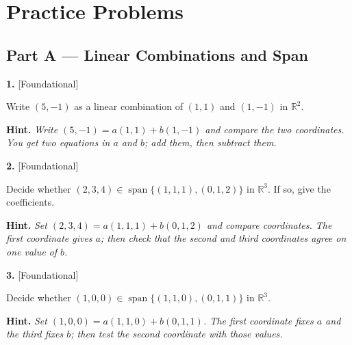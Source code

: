 \documentclass[11pt]{article}
\begin{document}
\section*{\large\color{ink} Practice Problems}
\subsection*{\normalsize\color{ink} Part A --- Linear Combinations and Span}
\begin{minipage}{\linewidth}\textbf{1.} \hfill{\scriptsize\color{ink}[Foundational]}\par\nopagebreak Write $(5,-1)$ as a linear combination of $(1,1)$ and $(1,-1)$ in $\mathbb{R}^{2}$.
\par\smallskip\begingroup\small\color{ink}\textbf{Hint.} \textit{Write $(5,-1)=a(1,1)+b(1,-1)$ and compare the two coordinates. You get two equations in $a$ and $b$; add them, then subtract them.}\endgroup
\vspace{3.0cm}\end{minipage}\par\vspace{4pt}
\begin{minipage}{\linewidth}\textbf{2.} \hfill{\scriptsize\color{ink}[Foundational]}\par\nopagebreak Decide whether $(2,3,4)\in\operatorname{span}\{(1,1,1),(0,1,2)\}$ in $\mathbb{R}^{3}$. If so, give the coefficients.
\par\smallskip\begingroup\small\color{ink}\textbf{Hint.} \textit{Set $(2,3,4)=a(1,1,1)+b(0,1,2)$ and compare coordinates. The first coordinate gives $a$; then check that the second and third coordinates agree on one value of $b$.}\endgroup
\vspace{3.4cm}\end{minipage}\par\vspace{4pt}
\begin{minipage}{\linewidth}\textbf{3.} \hfill{\scriptsize\color{ink}[Foundational]}\par\nopagebreak Decide whether $(1,0,0)\in\operatorname{span}\{(1,1,0),(0,1,1)\}$ in $\mathbb{R}^{3}$.
\par\smallskip\begingroup\small\color{ink}\textbf{Hint.} \textit{Set $(1,0,0)=a(1,1,0)+b(0,1,1)$. The first coordinate fixes $a$ and the third fixes $b$; then test the second coordinate with those values.}\endgroup
\vspace{3.4cm}\end{minipage}\par\vspace{4pt}
\end{document}
